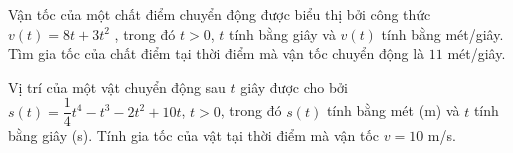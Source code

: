 \begin{ex}%
	Vận tốc  của một chất điểm chuyển động được biểu thị bởi công thức $v(t)=8t+3t^2$ , trong đó $t > 0$, $t$ tính bằng giây và $v(t)$ tính bằng mét/giây. Tìm gia tốc của chất điểm tại thời điểm mà vận tốc chuyển động là $11$ mét/giây.
\end{ex}

\begin{bt}%
	Vị trí của một vật chuyển động sau $t$ giây được cho bởi $s(t)=\dfrac{1}{4} t^4-t^3-2 t^2+10 t$, $t>0$, trong đó $s(t)$ tính bằng mét (m) và $t$ tính bằng giây (s). Tính gia tốc của vật tại thời điểm mà vận tốc $v=10$ m/s.
\end{bt}

